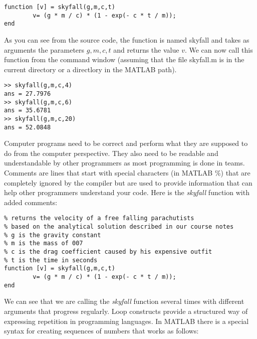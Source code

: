 \documentclass [titlepage,12pt,letter] {article}
\begin{document}
\begin{verbatim} 
function [v] = skyfall(g,m,c,t)
        v= (g * m / c) * (1 - exp(- c * t / m));
end
\end{verbatim} 

\noindent 

As you can see from the source code, the function is named skyfall and
takes as arguments the parameters $g,m,c,t$ and returns the value
$v$. We can now call this function from the command window (assuming
that the file skyfall.m is in the current directory or a directlory in
the MATLAB path).

\begin{verbatim} 
>> skyfall(g,m,c,4)
ans = 27.7976
>> skyfall(g,m,c,6)
ans = 35.6781
>> skyfall(g,m,c,20)
ans = 52.0848
\end{verbatim}
\noindent 

Computer programs need to be correct and perform what they are
supposed to do from the computer perspective. They also need to be
readable and understandable by other programmers as most programming
is done in teams. Comments are lines that start with special
characters (in MATLAB $\%$) that are completely ignored by the
compiler but are used to provide information that can help other
programmers understand your code. Here is the {\it skyfall} function 
with added comments: 

\begin{verbatim} 
% returns the velocity of a free falling parachutists 
% based on the analytical solution described in our course notes 
% g is the gravity constant 
% m is the mass of 007 
% c is the drag coefficient caused by his expensive outfit 
% t is the time in seconds 
function [v] = skyfall(g,m,c,t)
        v= (g * m / c) * (1 - exp(- c * t / m));
end
\end{verbatim} 


We can see that we are calling the {\it skyfall}
function several times with different arguments that progress regularly. Loop
constructs provide a structured way of expressing repetition in
programming languages. In MATLAB there is a special syntax
for creating sequences of numbers that works as follows:
\end{document}
